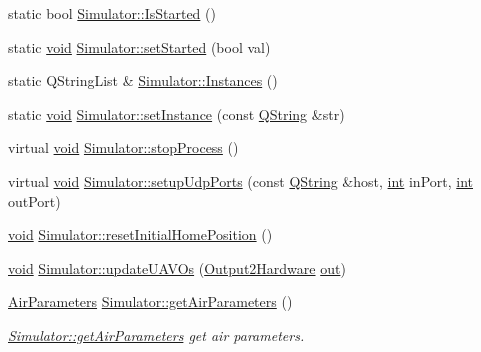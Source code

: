 \begin{DoxyCompactItemize}
static bool \hyperlink{group___h_i_t_l_plugin_gab258fc4b0cfb2d1fc7cfc2e39f12295f}{Simulator\-::\-Is\-Started} ()
\item 
static \hyperlink{group___u_a_v_objects_plugin_ga444cf2ff3f0ecbe028adce838d373f5c}{void} \hyperlink{group___h_i_t_l_plugin_ga077a3be12724a8b465c5ed557abbca33}{Simulator\-::set\-Started} (bool val)
\item 
static Q\-String\-List \& \hyperlink{group___h_i_t_l_plugin_ga7a56fe71f90b375de179eea6369025c9}{Simulator\-::\-Instances} ()
\item 
static \hyperlink{group___u_a_v_objects_plugin_ga444cf2ff3f0ecbe028adce838d373f5c}{void} \hyperlink{group___h_i_t_l_plugin_ga8f691dedcee72e956c36f52009718cad}{Simulator\-::set\-Instance} (const \hyperlink{group___u_a_v_objects_plugin_gab9d252f49c333c94a72f97ce3105a32d}{Q\-String} \&str)
\item 
virtual \hyperlink{group___u_a_v_objects_plugin_ga444cf2ff3f0ecbe028adce838d373f5c}{void} \hyperlink{group___h_i_t_l_plugin_ga12b351ec9ec8410a28d4f0f3d04ef9b6}{Simulator\-::stop\-Process} ()
\item 
virtual \hyperlink{group___u_a_v_objects_plugin_ga444cf2ff3f0ecbe028adce838d373f5c}{void} \hyperlink{group___h_i_t_l_plugin_ga106e46211d3a00bd4a7b3b3918b23f63}{Simulator\-::setup\-Udp\-Ports} (const \hyperlink{group___u_a_v_objects_plugin_gab9d252f49c333c94a72f97ce3105a32d}{Q\-String} \&host, \hyperlink{ioapi_8h_a787fa3cf048117ba7123753c1e74fcd6}{int} in\-Port, \hyperlink{ioapi_8h_a787fa3cf048117ba7123753c1e74fcd6}{int} out\-Port)
\item 
\hyperlink{group___u_a_v_objects_plugin_ga444cf2ff3f0ecbe028adce838d373f5c}{void} \hyperlink{group___h_i_t_l_plugin_ga23bcac84c193a077fca82e61e250b99f}{Simulator\-::reset\-Initial\-Home\-Position} ()
\item 
\hyperlink{group___u_a_v_objects_plugin_ga444cf2ff3f0ecbe028adce838d373f5c}{void} \hyperlink{group___h_i_t_l_plugin_gad1625bf27fadfc6a51218ad76d9926a6}{Simulator\-::update\-U\-A\-V\-Os} (\hyperlink{struct_output2_hardware}{Output2\-Hardware} \hyperlink{uavobjecttemplate_8m_a2a89187d8e8e8fba509ef9ab5f815d88}{out})
\item 
\hyperlink{struct_air_parameters}{Air\-Parameters} \hyperlink{group___h_i_t_l_plugin_ga68df0005072e39f3a7208aa63944f4dd}{Simulator\-::get\-Air\-Parameters} ()
\begin{DoxyCompactList}\small\item\em \hyperlink{group___h_i_t_l_plugin_ga68df0005072e39f3a7208aa63944f4dd}{Simulator\-::get\-Air\-Parameters} get air parameters. \end{DoxyCompactList}\item 

\end{DoxyCompactItemize}
